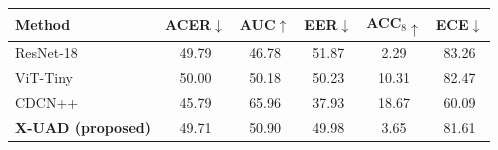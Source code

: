 \begin{tabular}{lccccc}
\toprule
Method & ACER$\downarrow$ & AUC$\uparrow$ & EER$\downarrow$ & ACC$_8\uparrow$ & ECE$\downarrow$ \\
\midrule
ResNet-18~\cite{he2016resnet} & 49.79 & 46.78 & 51.87 & 2.29 & 83.26 \\
ViT-Tiny~\cite{dosovitskiy2021vit} & 50.00 & 50.18 & 50.23 & 10.31 & 82.47 \\
CDCN++~\cite{yu2020cdcn} & 45.79 & 65.96 & 37.93 & 18.67 & 60.09 \\
\textbf{X-UAD (proposed)} & 49.71 & 50.90 & 49.98 & 3.65 & 81.61 \\
\bottomrule
\end{tabular}